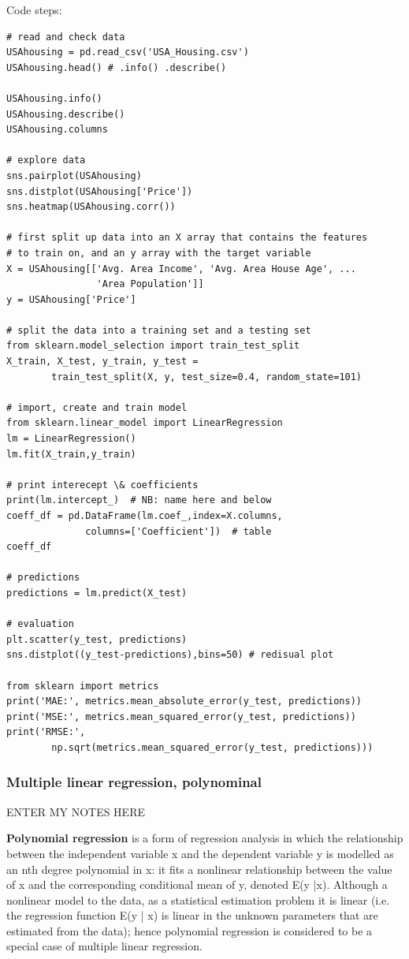 \documentclass[12pt]{article}
\begin{document}
Code steps:
\begin{lstlisting}
# read and check data
USAhousing = pd.read_csv('USA_Housing.csv')
USAhousing.head() # .info() .describe()

USAhousing.info()
USAhousing.describe()
USAhousing.columns

# explore data
sns.pairplot(USAhousing)
sns.distplot(USAhousing['Price'])
sns.heatmap(USAhousing.corr())

# first split up data into an X array that contains the features 
# to train on, and an y array with the target variable
X = USAhousing[['Avg. Area Income', 'Avg. Area House Age', ... 
				'Area Population']]
y = USAhousing['Price']

# split the data into a training set and a testing set
from sklearn.model_selection import train_test_split
X_train, X_test, y_train, y_test = 
		train_test_split(X, y, test_size=0.4, random_state=101)

# import, create and train model
from sklearn.linear_model import LinearRegression
lm = LinearRegression()
lm.fit(X_train,y_train)

# print interecept \& coefficients
print(lm.intercept_)  # NB: name here and below
coeff_df = pd.DataFrame(lm.coef_,index=X.columns, 
              columns=['Coefficient'])  # table
coeff_df

# predictions
predictions = lm.predict(X_test)

# evaluation
plt.scatter(y_test, predictions)
sns.distplot((y_test-predictions),bins=50) # redisual plot

from sklearn import metrics
print('MAE:', metrics.mean_absolute_error(y_test, predictions))
print('MSE:', metrics.mean_squared_error(y_test, predictions))
print('RMSE:', 
		np.sqrt(metrics.mean_squared_error(y_test, predictions)))
\end{lstlisting}


\subsubsection{Multiple linear regression, polynominal}
ENTER MY NOTES HERE

\textbf{Polynomial regression} is a form of regression analysis in which the relationship between the independent variable x and the dependent variable y is modelled as an nth degree polynomial in x: it  fits a nonlinear relationship between the value of x and the corresponding conditional mean of y, denoted E(y |x). Although a nonlinear model to the data, as a statistical estimation problem it is linear (i.e. the regression function E(y | x) is linear in the unknown parameters that are estimated from the data); hence polynomial regression is considered to be a special case of multiple linear regression.
\end{document}
